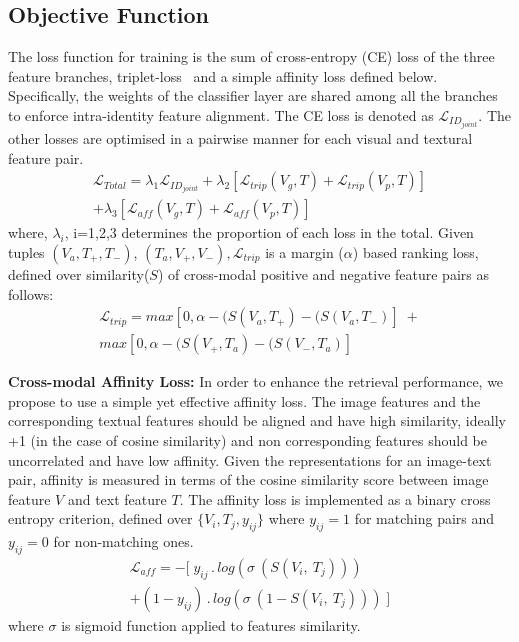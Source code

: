 \documentclass[letterpaper]{article} \usepackage{aaai22}  \usepackage{times}  \usepackage{helvet}  \usepackage{courier}  \usepackage[hyphens]{url}  \usepackage{graphicx} \urlstyle{rm} \def\UrlFont{\rm}  \usepackage{natbib}  \usepackage{caption} \DeclareCaptionStyle{ruled}{labelfont=normalfont,labelsep=colon,strut=off} \frenchspacing  \setlength{\pdfpagewidth}{8.5in}  \setlength{\pdfpageheight}{11in}  \usepackage{algorithm}
\begin{document}
\subsection{Objective Function}
The loss function for training is the sum of cross-entropy (CE) loss of the three feature branches, triplet-loss~\cite{chechik2009large} and a simple affinity loss defined below. Specifically, the weights of the classifier layer are shared among all the branches to enforce intra-identity feature alignment. The CE loss is denoted as $\mathcal{L}_{ID_{joint}}$. The other losses are optimised in a pairwise manner for each visual and textural feature pair.
\setlength{\abovedisplayskip}{0pt} \setlength{\abovedisplayshortskip}{0pt}
\begin{multline}
    \mathcal{L}_{Total} = \lambda_{1} \mathcal{L}_{ID_{joint}} + \lambda_{2} [\mathcal{L}_{trip}(V_{g}, T) + \mathcal{L}_{trip}(V_{p}, T)] \\ + \lambda_{3} [\mathcal{L}_{aff}(V_{g}, T) + \mathcal{L}_{aff}(V_{p}, T)]
\end{multline}
where, $\lambda_i$, i=1,2,3 determines the proportion of each loss in the total.
Given tuples $(V_{a},T_{+}, T_{-})$, $(T_{a},V_{+}, V_{-}), \mathcal{L}_{trip}$ is a margin ($\alpha$) based ranking loss, defined over similarity($S$) of cross-modal positive and negative feature pairs as follows:
\setlength{\abovedisplayskip}{0pt} \setlength{\abovedisplayshortskip}{0pt}
\begin{multline}
    \mathcal{L}_{trip} = max[0,\alpha -(S(V_{a},T_{+})-(S(V_{a},T_{-})]\; + \\ 
    max[0,\alpha -(S(V_{+},T_{a})-(S(V_{-},T_{a})]
\end{multline}

\noindent\textbf{Cross-modal Affinity Loss:}
In order to enhance the retrieval performance, we propose to use a simple yet effective affinity loss. The image features and the corresponding textual features should be aligned and have high similarity, ideally +1 (in the case of cosine similarity) and non corresponding features should be uncorrelated and have low affinity. Given the representations for an image-text pair, affinity is measured in terms of the cosine similarity score between image feature $V$ and text feature $T$. The affinity loss is implemented as a binary cross entropy criterion, defined over $\{V_{i}, T_{j},y_{ij} \}$  where $y_{ij} = 1$ for matching pairs and $y_{ij} = 0$ for non-matching ones.
\setlength{\belowdisplayskip}{0pt} \setlength{\belowdisplayshortskip}{0pt}
\setlength{\abovedisplayskip}{0pt} \setlength{\abovedisplayshortskip}{0pt}
\begin{multline}
     \mathcal{L}_{aff} = -[\; y_{ij}\,.\,log(\sigma \ (S(V_{i},\ T_{j})))\,\\ + (1-y_{ij})\,.\,log(\sigma \ (1-S(V_{i},\ T_{j})))\; ]
\end{multline}
where $\sigma$ is sigmoid function applied to features similarity.
\end{document}
